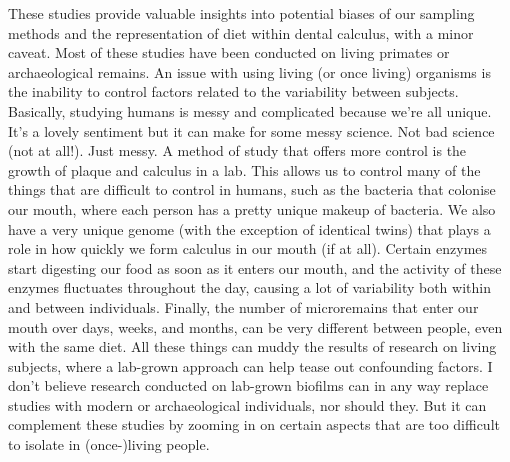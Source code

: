 \documentclass[
  letterpaper,
]{book}
\begin{document}
These studies provide valuable insights into potential biases of our
sampling methods and the representation of diet within dental calculus,
with a minor caveat. Most of these studies have been conducted on living
primates or archaeological remains. An issue with using living (or once
living) organisms is the inability to control factors related to the
variability between subjects. Basically, studying humans is messy and
complicated because we're all unique. It's a lovely sentiment but it can
make for some messy science. Not bad science (not at all!). Just messy.
A method of study that offers more control is the growth of plaque and
calculus in a lab. This allows us to control many of the things that are
difficult to control in humans, such as the bacteria that colonise our
mouth, where each person has a pretty unique makeup of bacteria. We also
have a very unique genome (with the exception of identical twins) that
plays a role in how quickly we form calculus in our mouth (if at all).
Certain enzymes start digesting our food as soon as it enters our mouth,
and the activity of these enzymes fluctuates throughout the day, causing
a lot of variability both within and between individuals. Finally, the
number of microremains that enter our mouth over days, weeks, and
months, can be very different between people, even with the same diet.
All these things can muddy the results of research on living subjects,
where a lab-grown approach can help tease out confounding factors. I
don't believe research conducted on lab-grown biofilms can in any way
replace studies with modern or archaeological individuals, nor should
they. But it can complement these studies by zooming in on certain
aspects that are too difficult to isolate in (once-)living people.
\end{document}
